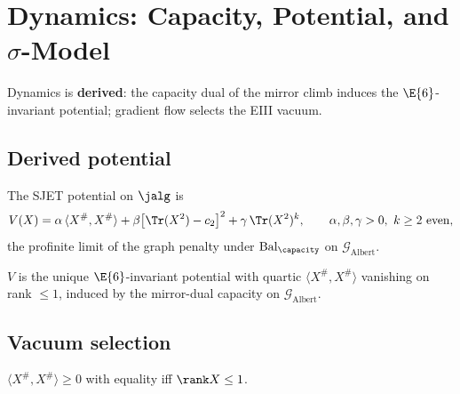 \section{Dynamics: Capacity, Potential, and $\sigma$-Model}
\label{sec:dynamics}

Dynamics is \textbf{derived}: the capacity dual of the mirror climb induces the
$\E{6}$-invariant potential; gradient flow selects the EIII vacuum.

\subsection{Derived potential}
\label{sec:dynamics:potential}

\begin{definition}\label{def:dynamics:Vdef}
The SJET potential on $\jalg$ is
\begin{equation}\label{eq:dynamics:V}
  V(X)=\alpha\,\langle X^{\#},X^{\#}\rangle
  +\beta\bigl[\Tr(X^2)-c_2\bigr]^2
  +\gamma\,\Tr(X^2)^k,
  \qquad \alpha,\beta,\gamma>0,\ k\geq2\ \text{even},
\end{equation}
the profinite limit of the graph penalty under $\mathrm{Bal}_\capacity$ on
$\mathcal{G}_{\mathrm{Albert}}$.
\end{definition}

\begin{theorem}\label{thm:dynamics:potential}
$V$ is the unique $\E{6}$-invariant potential with quartic
$\langle X^{\#},X^{\#}\rangle$ vanishing on rank $\leq1$, induced by the
mirror-dual capacity on $\mathcal{G}_{\mathrm{Albert}}$.
\end{theorem}

\subsection{Vacuum selection}
\label{sec:dynamics:vacuum}

\begin{lemma}\label{lem:dynamics:sharp}
$\langle X^{\#},X^{\#}\rangle\geq0$ with equality iff $\rank X\leq1$.
\end{lemma}

